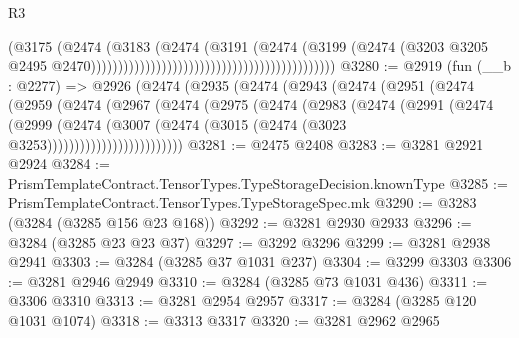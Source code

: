 \begin{lexlean}{R3}
\begin{coremodule}
                                                                            (@3175
                                                                              (@2474
                                                                                (@3183
                                                                                  (@2474
                                                                                    (@3191
                                                                                      (@2474
                                                                                        (@3199
                                                                                          (@2474
                                                                                            (@3203
                                                                                              @3205
                                                                                              @2495
                                                                                              @2470)))))))))))))))))))))))))))))))))))))))))))))
@3280 := @2919
    (fun (__b : @2277) =>
    @2926
      (@2474
        (@2935
          (@2474
            (@2943
              (@2474
                (@2951
                  (@2474
                    (@2959
                      (@2474
                        (@2967
                          (@2474
                            (@2975
                              (@2474
                                (@2983
                                  (@2474
                                    (@2991
                                      (@2474
                                        (@2999
                                          (@2474
                                            (@3007
                                              (@2474
                                                (@3015 (@2474 (@3023 @3253)))))))))))))))))))))))))
@3281 := @2475 @2408
@3283 := @3281 @2921 @2924
@3284 := PrismTemplateContract.TensorTypes.TypeStorageDecision.knownType
@3285 := PrismTemplateContract.TensorTypes.TypeStorageSpec.mk
@3290 := @3283 (@3284 (@3285 @156 @23 @168))
@3292 := @3281 @2930 @2933
@3296 := @3284 (@3285 @23 @23 @37)
@3297 := @3292 @3296
@3299 := @3281 @2938 @2941
@3303 := @3284 (@3285 @37 @1031 @237)
@3304 := @3299 @3303
@3306 := @3281 @2946 @2949
@3310 := @3284 (@3285 @73 @1031 @436)
@3311 := @3306 @3310
@3313 := @3281 @2954 @2957
@3317 := @3284 (@3285 @120 @1031 @1074)
@3318 := @3313 @3317
@3320 := @3281 @2962 @2965

\end{coremodule}
\end{lexlean}
